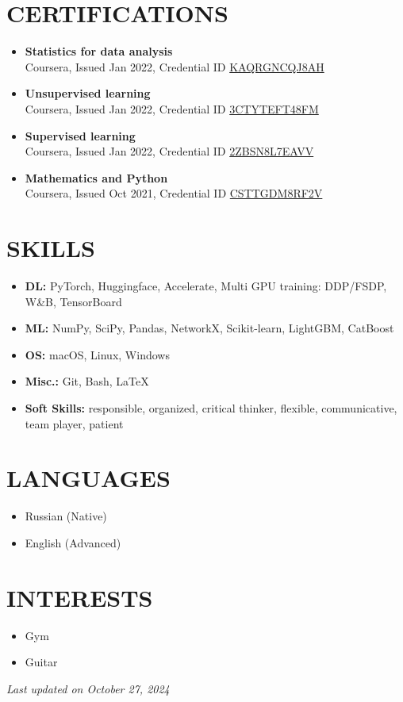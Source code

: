 \documentclass[11pt,a4paper]{moderncv}
\begin{document}
\section{CERTIFICATIONS}
\begin{itemize}
    \item \textbf{Statistics for data analysis}\\ Coursera, Issued Jan 2022, Credential ID \href{https://www.coursera.org/account/accomplishments/certificate/KAQRGNCQJ8AH}{KAQRGNCQJ8AH}
    \item \textbf{Unsupervised learning}\\ Coursera, Issued Jan 2022, Credential ID \href{https://www.coursera.org/account/accomplishments/certificate/3CTYTEFT48FM}{3CTYTEFT48FM}
    \item \textbf{Supervised learning}\\ Coursera, Issued Jan 2022, Credential ID \href{https://www.coursera.org/account/accomplishments/certificate/2ZBSN8L7EAVV}{2ZBSN8L7EAVV}
    \item \textbf{Mathematics and Python}\\ Coursera, Issued Oct 2021, Credential ID \href{https://www.coursera.org/account/accomplishments/certificate/CSTTGDM8RF2V}{CSTTGDM8RF2V}
\end{itemize}

\section{SKILLS}
\begin{itemize}
    \item \textbf{DL:} PyTorch, Huggingface, Accelerate, Multi GPU training: DDP/FSDP, W\&B, TensorBoard
    \item \textbf{ML:} NumPy, SciPy, Pandas, NetworkX, Scikit-learn, LightGBM, CatBoost
    \item \textbf{OS:} macOS, Linux, Windows
    \item \textbf{Misc.:} Git, Bash, \LaTeX
    \item \textbf{Soft Skills:} responsible, organized, critical thinker, flexible, communicative, team player, patient
\end{itemize}

\section{LANGUAGES}
\begin{itemize}
    \item Russian (Native)
    \item English (Advanced)
\end{itemize}

\section{INTERESTS}
\begin{itemize}
    \item Gym
    \item Guitar
\end{itemize}

\vspace{\fill}
\begin{center}
\textit{Last updated on October 27, 2024}
\end{center}
\vspace{-1.5cm}
\end{document}
